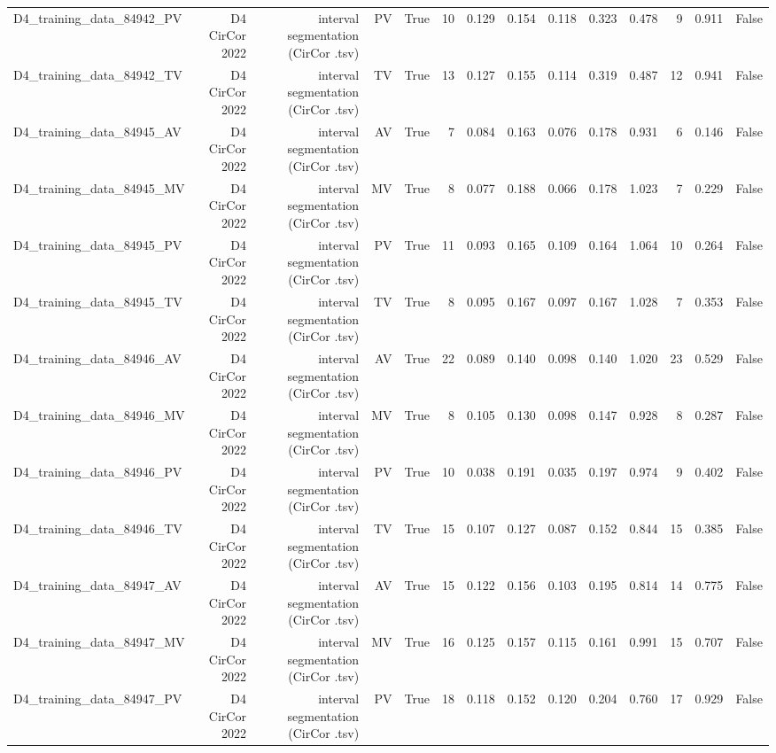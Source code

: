 \begin{table}[htbp]
\begin{tabular}{lrrrrrrrrrrrrr}
    D4\_training\_data\_84942\_PV & D4 CirCor 2022 & interval segmentation (CirCor .tsv) & PV & True & 10 & 0.129 & 0.154 & 0.118 & 0.323 & 0.478 & 9 & 0.911 & False \\
    D4\_training\_data\_84942\_TV & D4 CirCor 2022 & interval segmentation (CirCor .tsv) & TV & True & 13 & 0.127 & 0.155 & 0.114 & 0.319 & 0.487 & 12 & 0.941 & False \\
    D4\_training\_data\_84945\_AV & D4 CirCor 2022 & interval segmentation (CirCor .tsv) & AV & True & 7 & 0.084 & 0.163 & 0.076 & 0.178 & 0.931 & 6 & 0.146 & False \\
    D4\_training\_data\_84945\_MV & D4 CirCor 2022 & interval segmentation (CirCor .tsv) & MV & True & 8 & 0.077 & 0.188 & 0.066 & 0.178 & 1.023 & 7 & 0.229 & False \\
    D4\_training\_data\_84945\_PV & D4 CirCor 2022 & interval segmentation (CirCor .tsv) & PV & True & 11 & 0.093 & 0.165 & 0.109 & 0.164 & 1.064 & 10 & 0.264 & False \\
    D4\_training\_data\_84945\_TV & D4 CirCor 2022 & interval segmentation (CirCor .tsv) & TV & True & 8 & 0.095 & 0.167 & 0.097 & 0.167 & 1.028 & 7 & 0.353 & False \\
    D4\_training\_data\_84946\_AV & D4 CirCor 2022 & interval segmentation (CirCor .tsv) & AV & True & 22 & 0.089 & 0.140 & 0.098 & 0.140 & 1.020 & 23 & 0.529 & False \\
    D4\_training\_data\_84946\_MV & D4 CirCor 2022 & interval segmentation (CirCor .tsv) & MV & True & 8 & 0.105 & 0.130 & 0.098 & 0.147 & 0.928 & 8 & 0.287 & False \\
    D4\_training\_data\_84946\_PV & D4 CirCor 2022 & interval segmentation (CirCor .tsv) & PV & True & 10 & 0.038 & 0.191 & 0.035 & 0.197 & 0.974 & 9 & 0.402 & False \\
    D4\_training\_data\_84946\_TV & D4 CirCor 2022 & interval segmentation (CirCor .tsv) & TV & True & 15 & 0.107 & 0.127 & 0.087 & 0.152 & 0.844 & 15 & 0.385 & False \\
    D4\_training\_data\_84947\_AV & D4 CirCor 2022 & interval segmentation (CirCor .tsv) & AV & True & 15 & 0.122 & 0.156 & 0.103 & 0.195 & 0.814 & 14 & 0.775 & False \\
    D4\_training\_data\_84947\_MV & D4 CirCor 2022 & interval segmentation (CirCor .tsv) & MV & True & 16 & 0.125 & 0.157 & 0.115 & 0.161 & 0.991 & 15 & 0.707 & False \\
    D4\_training\_data\_84947\_PV & D4 CirCor 2022 & interval segmentation (CirCor .tsv) & PV & True & 18 & 0.118 & 0.152 & 0.120 & 0.204 & 0.760 & 17 & 0.929 & False \\

\end{tabular}
\end{table}
